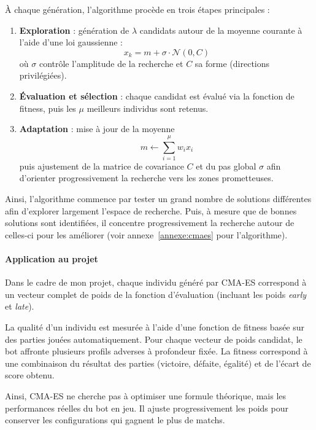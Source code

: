 \documentclass[11pt,a4paper]{article}
\begin{document}
À chaque génération, l’algorithme procède en trois étapes principales :

\begin{enumerate}
  \item \textbf{Exploration} : génération de $\lambda$ candidats autour de la moyenne courante à l’aide d’une loi gaussienne :
  \[
  x_k = m + \sigma \cdot \mathcal{N}(0, C)
  \]
  où $\sigma$ contrôle l’amplitude de la recherche et $C$ sa forme (directions privilégiées).

  \item \textbf{Évaluation et sélection} : chaque candidat est évalué via la fonction de fitness, puis les $\mu$ meilleurs individus sont retenus.

  \item \textbf{Adaptation} : mise à jour de la moyenne
  \[
  m \leftarrow \sum_{i=1}^{\mu} w_i x_i
  \]
  puis ajustement de la matrice de covariance $C$ et du pas global $\sigma$ afin d’orienter progressivement la recherche vers les zones prometteuses.
\end{enumerate}

Ainsi, l’algorithme commence par tester un grand nombre de solutions différentes afin d’explorer largement l’espace de recherche.
Puis, à mesure que de bonnes solutions sont identifiées, il concentre progressivement la recherche autour de celles-ci pour les
améliorer (voir annexe~\ref{annexe:cmaes} pour l'algorithme).

\paragraph{Application au projet}

Dans le cadre de mon projet, chaque individu généré par CMA-ES correspond à un vecteur complet de poids de la fonction
d'évaluation (incluant les poids \textit{early} et \textit{late}).

La qualité d'un individu est mesurée à l'aide d'une fonction de fitness basée sur des parties jouées automatiquement. Pour
chaque vecteur de poids candidat, le bot affronte plusieurs profils adverses à profondeur fixée. La fitness correspond à
une combinaison du résultat des parties (victoire, défaite, égalité) et de l'écart de score obtenu.

Ainsi, CMA-ES ne cherche pas à optimiser une formule théorique, mais les performances réelles du bot en jeu. Il ajuste progressivement les poids pour conserver les configurations qui gagnent le plus de matchs.
\end{document}
